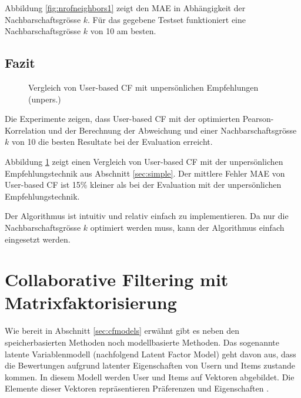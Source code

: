 \documentclass[a4paper, 12pt]{article}
\begin{document}
Abbildung \ref{fig:nrofneighbors1} zeigt den MAE in Abhängigkeit der Nachbarschaftsgrösse $k$. Für das gegebene Testset funktioniert eine Nachbarschaftsgrösse $k$ von 10 am besten.

\subsection{Fazit}

\begin{figure}
  \centering
{}

\caption{Vergleich von User-based CF mit unpersönlichen Empfehlungen (unpers.)}
\label{fig:uuvsbui}
\end{figure}

Die Experimente zeigen, dass User-based CF mit der optimierten Pearson-Korrelation und der Berechnung der Abweichung und einer Nachbarschaftsgrösse $k$ von 10 die besten Resultate bei der Evaluation erreicht.

Abbildung \ref{fig:uuvsbui} zeigt einen Vergleich von User-based CF mit der unpersönlichen Empfehlungstechnik aus Abschnitt \ref{sec:simple}. Der mittlere Fehler MAE von User-based CF  ist 15\% kleiner als bei der Evaluation mit der unpersönlichen Empfehlungstechnik.

Der Algorithmus ist intuitiv und relativ einfach zu implementieren. Da nur die Nachbarschaftsgrösse $k$ optimiert werden muss, kann der Algorithmus einfach eingesetzt werden. 

\section{Collaborative Filtering mit Matrixfaktorisierung}
\label{sec:matrixfactorization}

Wie bereit in Abschnitt \ref{sec:cfmodels} erwähnt gibt es neben den speicherbasierten Methoden noch modellbasierte Methoden. Das sogenannte latente Variablenmodell (nachfolgend Latent Factor Model) geht davon aus, dass die Bewertungen aufgrund latenter Eigenschaften von Usern und Items zustande kommen. In diesem Modell werden User und Items auf Vektoren abgebildet. Die Elemente dieser Vektoren repräsentieren Präferenzen und Eigenschaften \cite{koren2009}.
\end{document}
